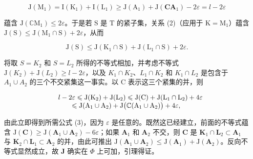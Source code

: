 \[
\mathrm{J} \left(\mathrm{M} _ {1}\right) = \mathrm{I} \left(\mathrm{K} _ {1}\right) + \mathrm{I} \left(\mathrm{L} _ {1}\right) \geqslant \mathrm{J} \left(\mathrm{A} _ {1}\right) + \mathrm{J} \left(\mathbf {C A} _ {1}\right) - 2 \varepsilon = l - 2 \varepsilon
\]

蕴含 \(\mathrm{J}(\mathbb{C}\mathrm{M}_1) \leqslant 2\varepsilon\)。于是若 \(\mathrm{S}\) 是 \(\mathrm{T}\) 的紧子集，关系 (2)（应用于 \(\mathrm{K} = \mathrm{M}_1\)）蕴含 \(\mathrm{J}(\mathrm{S}) \leqslant \mathrm{J}(\mathrm{M}_1 \cap \mathrm{S}) + 2\varepsilon\)，从而

\[
\mathrm{J} (\mathrm{S}) \leqslant \mathrm{J} (\mathrm{K} _ {1} \cap \mathrm{S}) + \mathrm{J} (\mathrm{L} _ {1} \cap \mathrm{S}) + 2 \varepsilon .
\]

将取 \(S = K_{2}\) 和 \(S = L_{2}\) 所得的不等式相加，并考虑不等式 \(\mathrm{J}(K_{2}) + \mathrm{J}(L_{2}) \geqslant l - 2\varepsilon\)，以及 \(K_{1} \cap K_{2}\)、\(L_{1} \cap K_{2}\) 和 \(K_{1} \cap L_{2}\) 是包含于 \(A_{1} \cup A_{2}\) 的三个不交紧集这一事实。以 C 表示这三个紧集的并，则

\[
\begin{array}{r l} & {l - 2 \varepsilon \leqslant \mathrm{J} (\mathrm{K} _ {2}) + \mathrm{J} (\mathrm{L} _ {2}) \leqslant \mathrm{J} (\mathrm{C}) + \mathrm{J} (\mathrm{L} _ {1} \cap \mathrm{L} _ {2}) + 4 \varepsilon} \\ & {\qquad \leqslant \mathrm{J} (\mathrm{A} _ {1} \cup \mathrm{A} _ {2}) + \mathrm{J} \big (\mathbb {C} (\mathrm{A} _ {1} \cup \mathrm{A} _ {2}) \big) + 4 \varepsilon ,} \end{array}
\]

由此立即得到所需公式 (3)，因为 \(\varepsilon\) 是任意的。既然这已经建立，前面的不等式蕴含 \(\mathrm{J}(\mathbf{C}) \geqslant \mathrm{J}(\mathbf{A}_1 \cup \mathbf{A}_2) - 6\varepsilon\)；如果 \(\mathbf{A}_1\) 和 \(\mathbf{A}_2\) 不交，则 \(\mathbf{C}\) 是 \(\mathbf{K}_1 \cap \mathbf{L}_2 \subset \mathbf{A}_1\) 与 \(\mathbf{K}_2 \cap \mathbf{L}_1 \subset \mathbf{A}_2\) 的并，由此可推出 \(\mathrm{J}(\mathbf{A}_1 \cup \mathbf{A}_2) \leqslant \mathrm{J}(\mathbf{A}_1) + \mathrm{J}(\mathbf{A}_2)\)。反向不等式显然成立，故 \(\mathbf{J}\) 确实在 \(\Phi\) 上可加，引理得证。

